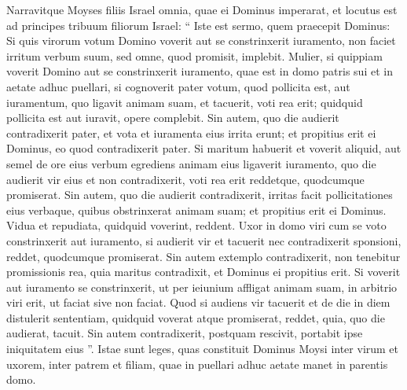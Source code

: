 \begin{biblechapter}
\begin{biblechapter}
\begin{biblechapter}
\begin{biblechapter}
\begin{biblechapter}
\begin{biblechapter}
\begin{biblechapter}
\begin{biblechapter}
\begin{biblechapter}
\begin{biblechapter}
\begin{biblechapter}
\begin{biblechapter}
\begin{biblechapter}
\begin{biblechapter}
\begin{biblechapter}
\begin{biblechapter}
\begin{biblechapter}
\begin{biblechapter}
\begin{biblechapter}
\begin{biblechapter}
\begin{biblechapter}
\begin{biblechapter}
\begin{biblechapter}
\begin{biblechapter}
\begin{biblechapter}
\begin{biblechapter}
\begin{biblechapter}
\begin{biblechapter}
\begin{biblechapter}
\begin{biblechapter}
\verse Narravitque Moyses filiis Israel omnia, quae ei Dominus imperarat, 
\verse et locutus est ad principes tribuum filiorum Israel: “ Iste est sermo, quem praecepit Dominus:
 \verse Si quis virorum votum Domino voverit aut se constrinxerit iuramento, non faciet irritum verbum suum, sed omne, quod promisit, implebit.
 \verse Mulier, si quippiam voverit Domino aut se constrinxerit iuramento, quae est in domo patris sui et in aetate adhuc puellari, 
\verse si cognoverit pater votum, quod pollicita est, aut iuramentum, quo ligavit animam suam, et tacuerit, voti rea erit; quidquid pollicita est aut iuravit, opere complebit. 
\verse Sin autem, quo die audierit contradixerit pater, et vota et iuramenta eius irrita erunt; et propitius erit ei Dominus, eo quod contradixerit pater.
 \verse Si maritum habuerit et voverit aliquid, aut semel de ore eius verbum egrediens animam eius ligaverit iuramento, 
\verse quo die audierit vir eius et non contradixerit, voti rea erit reddetque, quodcumque promiserat. 
\verse Sin autem, quo die audierit contradixerit, irritas facit pollicitationes eius verbaque, quibus obstrinxerat animam suam; et propitius erit ei Dominus.
 \verse Vidua et repudiata, quidquid voverint, reddent.
 \verse Uxor in domo viri cum se voto constrinxerit aut iuramento, 
\verse si audierit vir et tacuerit nec contradixerit sponsioni, reddet, quodcumque promiserat. 
 \verse Sin autem extemplo contradixerit, non tenebitur promissionis rea, quia maritus contradixit, et Dominus ei propitius erit. 
\verse Si voverit aut iuramento se constrinxerit, ut per ieiunium affligat animam suam, in arbitrio viri erit, ut faciat sive non faciat. 
\verse Quod si audiens vir tacuerit et de die in diem distulerit sententiam, quidquid voverat atque promiserat, reddet, quia, quo die audierat, tacuit. 
\verse Sin autem contradixerit, postquam rescivit, portabit ipse iniquitatem eius ”.
 \verse Istae sunt leges, quas constituit Dominus Moysi inter virum et uxorem, inter patrem et filiam, quae in puellari adhuc aetate manet in parentis domo.
 

\end{biblechapter}
\end{biblechapter}
\end{biblechapter}
\end{biblechapter}
\end{biblechapter}
\end{biblechapter}
\end{biblechapter}
\end{biblechapter}
\end{biblechapter}
\end{biblechapter}
\end{biblechapter}
\end{biblechapter}
\end{biblechapter}
\end{biblechapter}
\end{biblechapter}
\end{biblechapter}
\end{biblechapter}
\end{biblechapter}
\end{biblechapter}
\end{biblechapter}
\end{biblechapter}
\end{biblechapter}
\end{biblechapter}
\end{biblechapter}
\end{biblechapter}
\end{biblechapter}
\end{biblechapter}
\end{biblechapter}
\end{biblechapter}
\end{biblechapter}

